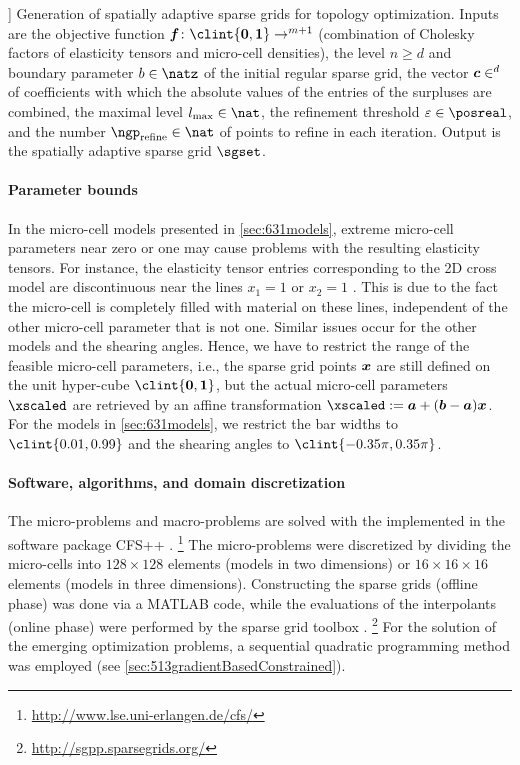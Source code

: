 \begin{algorithm}
  ]{%
    Generation of spatially adaptive sparse grids for topology optimization.
    Inputs are
    the objective function $\*f\colon \clint{\*0, \*1} \to \real^{m+1}$
    (combination of Cholesky factors of elasticity tensors and
    micro-cell densities),
    the level $n \ge d$ and boundary parameter $b \in \natz$ of the
    initial regular sparse grid,
    the vector $\*c \in \real^d$ of coefficients with which the
    absolute values of the entries of the surpluses are combined,
    the maximal level $l_{\max} \in \nat$,
    the refinement threshold $\varepsilon \in \posreal$, and
    the number $\ngp_{\mathrm{refine}} \in \nat$ of points to refine
    in each iteration.
    Output is the spatially adaptive sparse grid $\sgset$.%
  }%
  \label{alg:topoOptGridGeneration}%
\end{algorithm}

\paragraph{Parameter bounds}

In the micro-cell models presented in \cref{sec:631models},
extreme micro-cell parameters near zero or one may cause problems
with the resulting elasticity tensors.
For instance, the elasticity tensor entries corresponding to
the 2D cross model are discontinuous near the lines $x_1 = 1$ or $x_2 = 1$
.
This is due to the fact the micro-cell is completely filled with material
on these lines,
independent of the other micro-cell parameter that is not one.
Similar issues occur for the other models and the shearing angles.
Hence, we have to restrict the range of the feasible micro-cell parameters,
i.e., the sparse grid points ${\boldsymbol{x}}$ are still defined on the unit hyper-cube
$\clint{\*0, \*1}$,
but the actual micro-cell parameters $\xscaled$ are retrieved by an
affine transformation $\xscaled := \*a + (\*b - \*a) \*x$.
For the models in \cref{sec:631models},
we restrict the bar widths to $\clint{0.01, 0.99}$ and
the shearing angles to $\clint{-0.35\pi, 0.35\pi}$.

\paragraph{Software, algorithms, and domain discretization}

The micro-problems and macro-problems are solved with the \fem
implemented in the \fem software package CFS++ \cite{Kaltenbacher10Advanced}.%
\footnote{%
  \url{http://www.lse.uni-erlangen.de/cfs/}%
}
The micro-problems were discretized by dividing the micro-cells into
$128 \times 128$ elements (models in two dimensions) or
$16 \times 16 \times 16$ elements (models in three dimensions).
Constructing the sparse grids (offline phase) was done via a MATLAB code,
while the evaluations of the interpolants (online phase) were performed
by the sparse grid toolbox \sgpp \cite{Pflueger10Spatially}.%
\footnote{%
  \url{http://sgpp.sparsegrids.org/}%
}
For the solution of the emerging optimization problems,
a sequential quadratic programming method was employed
(see \cref{sec:513gradientBasedConstrained}).



